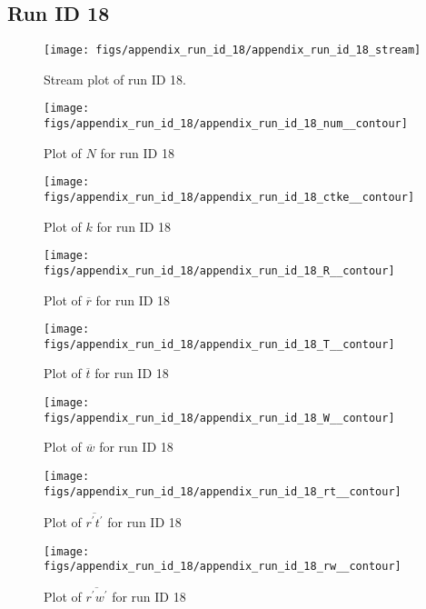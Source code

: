 \subsection{Run ID 18}
\begin{figure}[H]
\centering
\texttt{[image: figs/appendix\_run\_id\_18/appendix\_run\_id\_18\_stream]}
\caption{Stream plot of run ID 18.}
\label{fig:appendix_run_id_18_stream}
\end{figure}


\begin{figure}[H]
\centering
\texttt{[image: figs/appendix\_run\_id\_18/appendix\_run\_id\_18\_num\_\_contour]}
\caption{Plot of $N$ for run ID 18}
\label{fig:appendix_run_id_18_num__contour}
\end{figure}


\begin{figure}[H]
\centering
\texttt{[image: figs/appendix\_run\_id\_18/appendix\_run\_id\_18\_ctke\_\_contour]}
\caption{Plot of $k$ for run ID 18}
\label{fig:appendix_run_id_18_ctke__contour}
\end{figure}


\begin{figure}[H]
\centering
\texttt{[image: figs/appendix\_run\_id\_18/appendix\_run\_id\_18\_R\_\_contour]}
\caption{Plot of $\overline{r}$ for run ID 18}
\label{fig:appendix_run_id_18_R__contour}
\end{figure}


\begin{figure}[H]
\centering
\texttt{[image: figs/appendix\_run\_id\_18/appendix\_run\_id\_18\_T\_\_contour]}
\caption{Plot of $\overline{t}$ for run ID 18}
\label{fig:appendix_run_id_18_T__contour}
\end{figure}


\begin{figure}[H]
\centering
\texttt{[image: figs/appendix\_run\_id\_18/appendix\_run\_id\_18\_W\_\_contour]}
\caption{Plot of $\overline{w}$ for run ID 18}
\label{fig:appendix_run_id_18_W__contour}
\end{figure}


\begin{figure}[H]
\centering
\texttt{[image: figs/appendix\_run\_id\_18/appendix\_run\_id\_18\_rt\_\_contour]}
\caption{Plot of $\overline{r^\prime t^\prime}$ for run ID 18}
\label{fig:appendix_run_id_18_rt__contour}
\end{figure}


\begin{figure}[H]
\centering
\texttt{[image: figs/appendix\_run\_id\_18/appendix\_run\_id\_18\_rw\_\_contour]}
\caption{Plot of $\overline{r^\prime w^\prime}$ for run ID 18}
\label{fig:appendix_run_id_18_rw__contour}
\end{figure}


